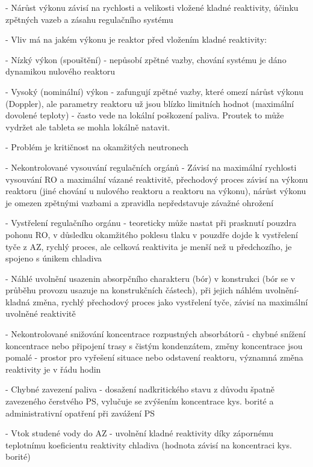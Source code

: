 \noindent - 	Nárůst výkonu závisí na rychlosti a velikosti vložené kladné reaktivity, účinku zpětných vazeb a zásahu regulačního systému

\noindent - 	Vliv má na jakém výkonu je reaktor před vložením kladné reaktivity:

-	Nízký výkon (spouštění) - nepůsobí zpětné vazby, chování systému je dáno dynamikou nulového reaktoru

-	Vysoký (nominální) výkon - zafungují zpětné vazby, které omezí nárůst výkonu (Doppler), ale parametry reaktoru už jsou blízko limitních hodnot (maximální dovolené teploty) - často vede na lokální poškození paliva. Proutek to může vydržet ale tableta se mohla lokálně natavit. 

\noindent - 	Problém je kritičnost na okamžitých neutronech

\noindent - 	Nekontrolované vysouvání regulačních orgánů - Závisí na maximální rychlosti vysouvání RO a maximální vázané reaktivitě, přechodový proces závisí na výkonu reaktoru (jiné chování u nulového reaktoru a reaktoru na výkonu), nárůst výkonu je omezen zpětnými vazbami a zpravidla nepředstavuje závažné ohrožení

\noindent - 	Vystřelení regulačního orgánu - teoreticky může nastat při prasknutí pouzdra pohonu RO, v důsledku okamžitého poklesu tlaku v pouzdře dojde k vystřelení tyče z AZ, rychlý proces, ale celková reaktivita je menší než u předchozího, je spojeno s únikem chladiva

\noindent - 	Náhlé uvolnění usazenin absorpčního charakteru (bór) v konstrukci (bór se v průběhu provozu usazuje na konstrukčních částech), při jejich náhlém uvolnění- kladná změna, rychlý přechodový proces jako vystřelení tyče, závisí na maximální uvolněné reaktivitě

\noindent - 	Nekontrolované snižování koncentrace rozpustných absorbátorů - chybné snížení koncentrace nebo připojení trasy s čistým kondenzátem, změny koncentrace jsou pomalé - prostor pro vyřešení situace nebo odstavení reaktoru, významná změna reaktivity je v řádu hodin

\noindent - 	Chybné zavezení paliva - dosažení nadkritického stavu z důvodu špatně zavezeného čerstvého PS, vylučuje se zvýšením koncentrace kys. borité a administrativní opatření při zavážení PS

\noindent - 	Vtok studené vody do AZ - uvolnění kladné reaktivity díky zápornému teplotnímu koeficientu reaktivity chladiva (hodnota závisí na koncentraci kys. borité)

